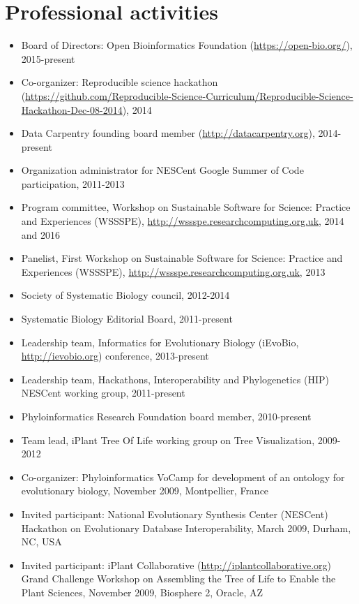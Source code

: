 \documentclass[10pt]{article}
\begin{document}
\section*{Professional activities}
\begin{itemize}
\item{Board of Directors: Open Bioinformatics Foundation (\url{https://open-bio.org/}), 2015-present}
\item{Co-organizer: Reproducible science hackathon (\url{https://github.com/Reproducible-Science-Curriculum/Reproducible-Science-Hackathon-Dec-08-2014}), 2014}
\item{Data Carpentry founding board member (\url{http://datacarpentry.org}), 2014-present}
\item{Organization administrator for NESCent Google Summer of Code participation, 2011-2013}
\item{Program committee, Workshop on Sustainable Software for Science: Practice and Experiences (WSSSPE), \url{http://wssspe.researchcomputing.org.uk}, 2014 and 2016}
\item{Panelist, First Workshop on Sustainable Software for Science: Practice and Experiences (WSSSPE), \url{http://wssspe.researchcomputing.org.uk}, 2013}
\item{Society of Systematic Biology council, 2012-2014}
\item{Systematic Biology Editorial Board, 2011-present}
\item{Leadership team, Informatics for Evolutionary Biology (iEvoBio, \url{http://ievobio.org}) conference, 2013-present}
\item{Leadership team, Hackathons, Interoperability and Phylogenetics (HIP) NESCent working group, 2011-present}
\item{Phyloinformatics Research Foundation board member, 2010-present}
\item{Team lead, iPlant Tree Of Life working group on Tree Visualization, 2009-2012}
\item{Co-organizer: Phyloinformatics VoCamp for development of an ontology for evolutionary biology, November 2009, Montpellier, France}
\item{Invited participant: National Evolutionary Synthesis Center (NESCent) Hackathon on Evolutionary Database Interoperability, March 2009, Durham, NC, USA}
\item{Invited participant: iPlant Collaborative (\url{http://iplantcollaborative.org}) Grand Challenge Workshop on Assembling the Tree of Life to Enable the Plant Sciences, November 2009, Biosphere 2, Oracle, AZ}

\end{itemize}
\end{document}
